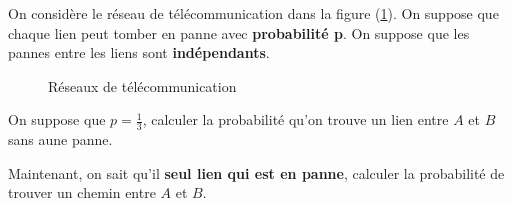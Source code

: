 \documentclass[11pt,largemargins]{homework}
\begin{document}
On considère le réseau de télécommunication dans la figure (\ref{fig:network}).
On suppose que chaque lien peut tomber en panne avec \textbf{probabilité p}. On
suppose que les pannes entre les liens sont \textbf{indépendants}.

\begin{figure}[htpb]
    \centering
    \caption{Réseaux de télécommunication}
    \label{fig:network}
\end{figure}

\begin{arabicparts}
    \item On  suppose que $p = \frac{1}{3}$, calculer la probabilité qu'on
        trouve un lien entre $A$ et $B$ sans aune panne.
    \item Maintenant, on sait qu'il \textbf{seul lien qui est en panne},
        calculer la probabilité de trouver un chemin entre $A$ et $B$.
\end{arabicparts}

\end{document}
